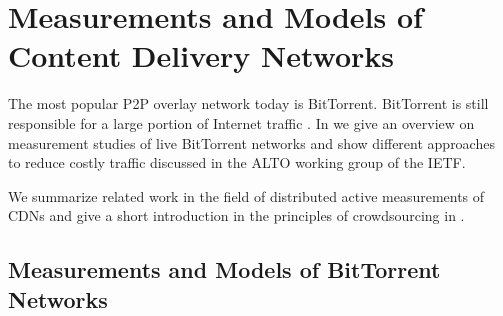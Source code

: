 \section{Measurements and Models of Content Delivery Networks}\label{sec:aslevel:measurements}

The most popular P2P overlay network today is BitTorrent.
BitTorrent is still responsible for a large portion of Internet traffic \cite{cisco2016,wamser2010}.
In  we give an overview on measurement studies of live BitTorrent networks and show different approaches to reduce costly traffic discussed in the ALTO working group of the IETF.

We summarize related work in the field of distributed active measurements of CDNs and give a short introduction in the principles of crowdsourcing in .

\subsection{Measurements and Models of BitTorrent Networks}\label{aslevel:measurements:bittorrent}

